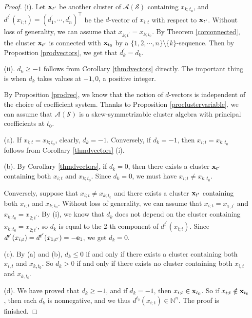 \documentclass[14pt]{amsart}
\begin{document}
\begin{proof}

(i). Let ${\bf x}_{t^\prime}$ be another cluster of $\mathcal A(\mathcal S)$ containing $x_{k;t_0}$, and $d^{t^\prime}(x_{i;t})=(d_1^\prime,\cdots,d_n^\prime)^{\top}$ be the $d$-vector of $x_{i;t}$ with respect to ${\bf x}_{t^\prime}$.
 Without loss of generality, we can assume that $x_{k;t^\prime}=x_{k;t_0}$. By Theorem \ref{corconnected}, the cluster ${\bf x}_{t^\prime}$ is connected with ${\bf x}_{t_0}$ by a $\{1,2,\cdots,n\}\setminus\{k\}$-sequence.
 Then by Proposition \ref{prodvectors}, we get that $d_k^\prime=d_k$.


(ii). $d_k\geq -1$ follows from Corollary  \ref{thmdvectors} directly. The important thing is when $d_k$ takes values at $-1,0$, a positive integer.


 By Proposition \ref{prodrec}, we know that the notion of $d$-vectors is independent of the choice of coefficient system. Thanks to Proposition \ref{proclustervariable}, we can assume that  $\mathcal A(\mathcal S)$ is a skew-symmetrizable cluster algebra with principal coefficients at $t_0$.




(a). If  $x_{i;t}=x_{k;t_0}$, clearly, $d_k=-1$. Conversely, if $d_k=-1$, then $x_{i;t}=x_{k;t_0}$ follows from  Corollary \ref{thmdvectors} (i).


(b). By Corollary  \ref{thmdvectors}, if $d_k=0$, then there exists a cluster ${\bf x}_{t^{\prime}}$ containing both $x_{i;t}$ and $x_{k;t_0}$. Since $d_k=0$, we must have $x_{i;t}\neq x_{k;t_0}$.

Conversely, suppose that $x_{i;t}\neq x_{k;t_0}$ and there exists a cluster ${\bf x}_{t^{\prime}}$ containing both $x_{i;t}$ and $x_{k;t_0}$. Without loss of generality, we can assume that $x_{i;t}=x_{1;t^\prime}$ and $x_{k;t_0}=x_{2;t^\prime}$.
By (i), we know that $d_k$ does not depend on the cluster containing $x_{k;t_0}=x_{2;t^\prime}$, so $d_k$ is equal to the $2$-th component of $d^{t^\prime}(x_{i;t})$. Since $d^{t^\prime}(x_{i;t})=d^{t^\prime}(x_{1;t^{\prime}})=-{\bf e}_1$, we get $d_k=0$.


(c). By (a) and (b), $d_k\leq 0$ if and only if there exists a cluster containing both $x_{i,t}$ and $x_{k,t_0}$. So $d_k>0$ if and only if there exists no cluster containing both $x_{i,t}$ and $x_{k,t_0}$.

(d). We have proved that $d_k\geq -1$, and if $d_k=-1$, then $x_{i;t}\in {\bf x}_{t_0}$.
So if $x_{i;t}\notin{\bf x}_{t_0}$, then each $d_k$ is nonnegative, and we thus $d^{t_0}(x_{i;t})\in\mathbb N^n$.
The proof is finished.
\end{proof}
\end{document}

